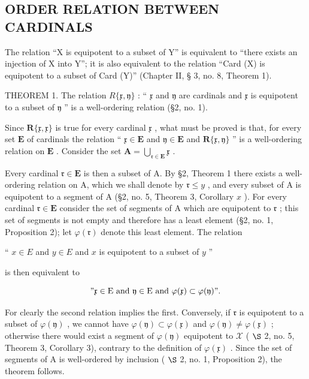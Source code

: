 \subsection{ORDER RELATION BETWEEN CARDINALS}

The relation ``X is equipotent to a subset of Y'' is equivalent to ``there exists an injection of X into Y''; it is also equivalent to the relation ``Card (X) is equipotent to a subset of Card (Y)'' (Chapter II, § 3, no. 8, Theorem 1).

THEOREM 1. The relation \(R\{\mathfrak{x}, \mathfrak{y}\}\) : `` \(\mathfrak{x}\) and \(\mathfrak{y}\) are cardinals and \(\mathfrak{x}\) is equipotent to a subset of \(\mathfrak{y}\) '' is a well-ordering relation (§2, no. 1).

Since \(\mathbf{R}\{\mathfrak{x},\mathfrak{x}\}\) is true for every cardinal \(\mathfrak{x}\) , what must be proved is that, for every set \(\mathbf{E}\) of cardinals the relation `` \(\mathfrak{x} \in \mathbf{E}\) and \(\mathfrak{y} \in \mathbf{E}\) and \(\mathbf{R}\{\mathfrak{x},\mathfrak{y}\}\) '' is a well-ordering relation on \(\mathbf{E}\) . Consider the set \(\mathbf{A} = \bigcup_{\mathfrak{r}\in \mathbf{E}}\mathfrak{x}\) .

Every cardinal \(\mathfrak{r} \in \mathbf{E}\) is then a subset of A. By §2, Theorem 1 there exists a well-ordering relation on A, which we shall denote by \(\mathfrak{r} \leqslant y\) , and every subset of A is equipotent to a segment of A (§2, no. 5, Theorem 3, Corollary \(x\) ). For every cardinal \(\mathfrak{r} \in \mathbf{E}\) consider the set of segments of A which are equipotent to \(\mathfrak{r}\) ; this set of segments is not empty and therefore has a least element (§2, no. 1, Proposition 2); let \(\varphi(\mathfrak{r})\) denote this least element. The relation

`` \(x \in E\) and \(y \in E\) and \(x\) is equipotent to a subset of \(y\) ''

is then equivalent to

\[
" \mathfrak {x} \in \mathrm{E} \text {   and   } \mathfrak {y} \in \mathrm{E} \text {   and   } \varphi (\mathfrak {x}) \subset \varphi (\mathfrak {y})".
\]

For clearly the second relation implies the first. Conversely, if \(\mathfrak{r}\) is equipotent to a subset of \(\varphi(\mathfrak{y})\) , we cannot have \(\varphi(\mathfrak{y}) \subset \varphi(\mathfrak{x})\) and \(\varphi(\mathfrak{y}) \neq \varphi(\mathfrak{x})\) ; otherwise there would exist a segment of \(\varphi(\mathfrak{y})\) equipotent to \(\mathcal{X}\) ( \(\S\) 2, no. 5, Theorem 3, Corollary 3), contrary to the definition of \(\varphi(\mathfrak{x})\) . Since the set of segments of A is well-ordered by inclusion ( \(\S\) 2, no. 1, Proposition 2), the theorem follows.

